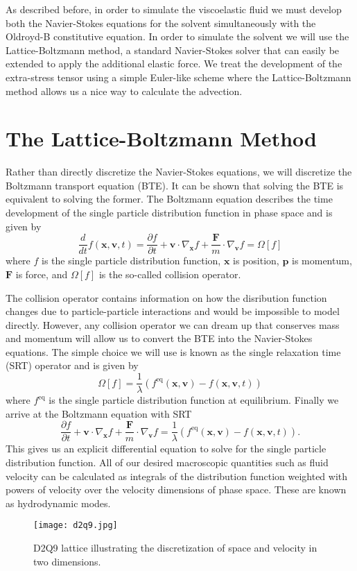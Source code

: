 As described before, in order to simulate the viscoelastic fluid we must develop both the Navier-Stokes equations for the solvent simultaneously with the Oldroyd-B constitutive equation. In order to simulate the solvent we will use the Lattice-Boltzmann method, a standard Navier-Stokes solver that can easily be extended to apply the additional elastic force. We treat the development of the extra-stress tensor using a simple Euler-like scheme where the Lattice-Boltzmann method allows us a nice way to calculate the advection.
\section{The Lattice-Boltzmann Method}
Rather than directly discretize the Navier-Stokes equations, we will discretize the Boltzmann transport equation (BTE). It can be shown that solving the BTE is equivalent to solving the former. The Boltzmann equation describes the time development of the single particle distribution function in phase space and is given by
\begin{equation}\label{eq:boltzmann_transport}
\frac{d}{dt} f(\bm{x}, \bm{v}, t) = \frac{\partial f}{\partial t} + \bm{v} \cdot \nabla_{\bm{x}}f + \frac{\bm{F}}{m} \cdot \nabla_{\bm{v}} f =\Omega[f] 
\end{equation}
where $f$ is the single particle distribution function, $\bm{x}$ is position, $\bm{p}$ is momentum, $\bm{F}$ is force, and $\Omega[f]$ is the so-called collision operator. 

The collision operator contains information on how the disribution function changes due to particle-particle interactions and would be impossible to model directly. However, any collision operator we can dream up that conserves mass and momentum will allow us to convert the BTE into the Navier-Stokes equations. The simple choice we will use is known as the single relaxation time (SRT) operator and is given by
\begin{equation}\label{eq:single_relaxation_time}
\Omega[f] = \frac{1}{\lambda}\left(f^{\mathrm{eq}}(\bm{x}, \bm{v}) - f(\bm{x}, \bm{v}, t)\right)
\end{equation}
where $f^{\mathrm{eq}}$ is the single particle distribution function at equilibrium. Finally we arrive at the Boltzmann equation with SRT
\begin{equation}\label{eq:boltzmann_srt}
\frac{\partial f}{\partial t} + \bm{v} \cdot \nabla_{\bm{x}}f + \frac{\bm{F}}{m} \cdot \nabla_{\bm{v}} f = \frac{1}{\lambda}\left(f^{\mathrm{eq}}(\bm{x}, \bm{v}) - f(\bm{x}, \bm{v}, t)\right).
\end{equation}
This gives us an explicit differential equation to solve for the single particle distribution function. All of our desired macroscopic quantities such as fluid velocity can be calculated as integrals of the distribution function weighted with powers of velocity over the velocity dimensions of phase space. These are known as hydrodynamic modes.
\begin{figure}[t]
\texttt{[image: d2q9.jpg]}
\centering
\caption{D2Q9 lattice illustrating the discretization of space and velocity in two dimensions.}
\label{fig:d2q9}
\end{figure}

